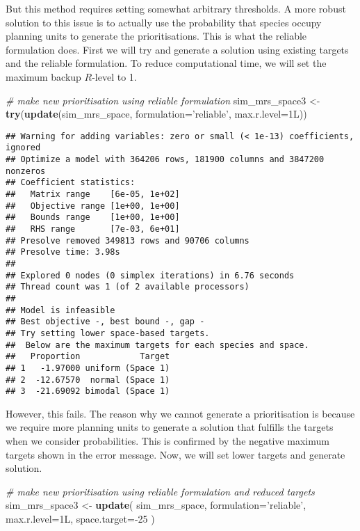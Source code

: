 \documentclass[11pt,]{article}
\newenvironment{Shaded}{\begin{snugshade}}{\end{snugshade}}
\newcommand{\KeywordTok}[1]{\textcolor[rgb]{0.13,0.29,0.53}{\textbf{{#1}}}}
\newcommand{\DataTypeTok}[1]{\textcolor[rgb]{0.13,0.29,0.53}{{#1}}}
\newcommand{\DecValTok}[1]{\textcolor[rgb]{0.00,0.00,0.81}{{#1}}}
\newcommand{\StringTok}[1]{\textcolor[rgb]{0.31,0.60,0.02}{{#1}}}
\newcommand{\CommentTok}[1]{\textcolor[rgb]{0.56,0.35,0.01}{\textit{{#1}}}}
\newcommand{\NormalTok}[1]{{#1}}
\begin{document}
But this method requires setting somewhat arbitrary thresholds. A more
robust solution to this issue is to actually use the probability that
species occupy planning units to generate the prioritisations. This is
what the reliable formulation does. First we will try and generate a
solution using existing targets and the reliable formulation. To reduce
computational time, we will set the maximum backup $R$-level to 1.

\begin{Shaded}
\begin{Highlighting}[]
\CommentTok{# make new prioritisation using reliable formulation}
\NormalTok{sim_mrs_space3 <-}\StringTok{ }\KeywordTok{try}\NormalTok{(}\KeywordTok{update}\NormalTok{(sim_mrs_space, }\DataTypeTok{formulation=}\StringTok{'reliable'}\NormalTok{, }\DataTypeTok{max.r.level=}\NormalTok{1L))}
\end{Highlighting}
\end{Shaded}

\begin{verbatim}
## Warning for adding variables: zero or small (< 1e-13) coefficients, ignored
## Optimize a model with 364206 rows, 181900 columns and 3847200 nonzeros
## Coefficient statistics:
##   Matrix range    [6e-05, 1e+02]
##   Objective range [1e+00, 1e+00]
##   Bounds range    [1e+00, 1e+00]
##   RHS range       [7e-03, 6e+01]
## Presolve removed 349813 rows and 90706 columns
## Presolve time: 3.98s
## 
## Explored 0 nodes (0 simplex iterations) in 6.76 seconds
## Thread count was 1 (of 2 available processors)
## 
## Model is infeasible
## Best objective -, best bound -, gap -
## Try setting lower space-based targets.
##  Below are the maximum targets for each species and space.
##   Proportion            Target
## 1   -1.97000 uniform (Space 1)
## 2  -12.67570  normal (Space 1)
## 3  -21.69092 bimodal (Space 1)
\end{verbatim}

However, this fails. The reason why we cannot generate a prioritisation
is because we require more planning units to generate a solution that
fulfills the targets when we consider probabilities. This is confirmed
by the negative maximum targets shown in the error message. Now, we will
set lower targets and generate solution.

\begin{Shaded}
\begin{Highlighting}[]
\CommentTok{# make new prioritisation using reliable formulation and reduced targets}
\NormalTok{sim_mrs_space3 <-}\StringTok{ }\KeywordTok{update}\NormalTok{(}
    \NormalTok{sim_mrs_space,}
    \DataTypeTok{formulation=}\StringTok{'reliable'}\NormalTok{,}
    \DataTypeTok{max.r.level=}\NormalTok{1L,}
    \DataTypeTok{space.target=}\NormalTok{-}\DecValTok{25}
\NormalTok{)}
\end{Highlighting}
\end{Shaded}
\end{document}
